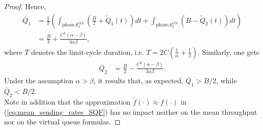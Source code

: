 \documentclass[a4paper,oneside, 11pt]{article}
\begin{document}
\begin{appendix}
\begin{proof}
Hence,
\begin{align}\label{mean-queue1}
\overline{Q}_1&=\frac{1}{T}\left(\int_{\text{phase}A_1^{ON}} \left(\frac{B}{2}+\widetilde{Q}_1(t)\right) dt + 
\int_{\text{phase}A_2^{ON}}(B-\widetilde{Q}_2(t)) dt \right)\nonumber \\
&= \frac{B}{2}+\frac{C^2(\alpha-\beta)}{3\alpha\beta},
\end{align}
where $T$ denotes the limit-cycle duration, i.e. $T=2C(\frac{1}{\alpha}+\frac{1}{\beta})$.
Similarly, one gets
\begin{align}\label{mean-queue2}
\overline{Q}_2&=\frac{B}{2}-\frac{C^2(\alpha-\beta)}{3\alpha\beta}.
\end{align}
Under the assumption $\alpha>\beta$, it results that, as expected, $\overline{Q}_1>B/2$, while $\overline{Q}_2<B/2$.\\
Note in addition that the approximation $\widetilde{f}(\cdot) \approx f(\cdot)$ in (\ref{eq:mean_sending_rates_SQF}) has no impact neither on the mean throughput nor on the virtual queue formulas.

\end{proof}

\end{appendix}
\end{document}
